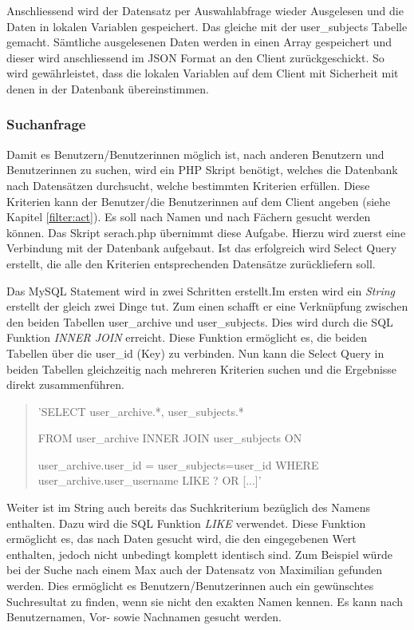 \documentclass[a4paper,11pt]{report}
\begin{document}
					Anschliessend wird der Datensatz per Auswahlabfrage wieder Ausgelesen und die Daten in lokalen Variablen gespeichert. Das gleiche mit der user\_subjects Tabelle gemacht. Sämtliche ausgelesenen Daten werden in einen Array gespeichert und dieser wird anschliessend im JSON Format an den Client zurückgeschickt. So wird gewährleistet, dass die lokalen Variablen auf dem Client mit Sicherheit mit denen in der Datenbank übereinstimmen.
					\subsubsection{Suchanfrage} \label{sssec:Suchanfrage}
					Damit es Benutzern/Benutzerinnen möglich ist, nach anderen Benutzern und Benutzerinnen zu suchen, wird ein PHP Skript benötigt, welches die Datenbank nach Datensätzen durchsucht, welche bestimmten Kriterien erfüllen. Diese Kriterien kann der Benutzer/die Benutzerinnen auf dem Client angeben (siehe Kapitel \ref{filter:act}). Es soll nach Namen und nach Fächern gesucht werden können. Das Skript serach.php übernimmt diese Aufgabe. Hierzu wird zuerst eine Verbindung mit der Datenbank aufgebaut. Ist das erfolgreich wird Select Query erstellt, die alle den Kriterien entsprechenden Datensätze zurückliefern soll. 
					
					Das MySQL Statement wird in zwei Schritten erstellt.Im ersten wird ein \emph{String} erstellt der gleich zwei Dinge tut. Zum einen schafft er eine Verknüpfung zwischen den beiden Tabellen user\_archive und user\_subjects. Dies wird durch die SQL Funktion \emph{INNER JOIN} erreicht. Diese Funktion ermöglicht es, die beiden Tabellen über die user\_id (Key) zu verbinden. Nun kann die Select Query in beiden Tabellen gleichzeitig nach mehreren Kriterien suchen und die Ergebnisse direkt zusammenführen.
					\begin{quotation}
						{\selectfont\noindent 'SELECT user\_archive.*, user\_subjects.* 
							
						\noindent FROM user\_archive INNER JOIN user\_subjects ON
						
						\noindent user\_archive.user\_id = user\_subjects=user\_id WHERE user\_archive.user\_username LIKE ? OR [...]'}
					\end{quotation} 
					Weiter ist im String auch bereits das Suchkriterium bezüglich des Namens enthalten. Dazu wird die SQL Funktion \emph{LIKE} verwendet. Diese Funktion ermöglicht es, das nach Daten gesucht wird, die den eingegebenen Wert enthalten, jedoch nicht unbedingt komplett identisch sind. Zum Beispiel würde bei der Suche nach einem \glqq Max\grqq{} auch der Datensatz von \glqq Maximilian\grqq{} gefunden werden. Dies ermöglicht es Benutzern/Benutzerinnen auch ein gewünschtes Suchresultat zu finden, wenn sie nicht den exakten Namen kennen. Es kann nach Benutzernamen, Vor- sowie Nachnamen gesucht werden.
					
\end{document}
